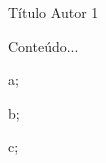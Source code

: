 \hypearticle
{Título}
{Autor 1}
{

Conteúdo...


\begin{hypeitemize}
\item a;
\item b;
\item c;
\end{hypeitemize}


}
